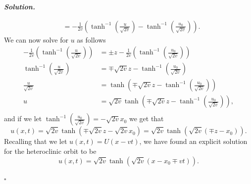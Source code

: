 \documentclass[12pt]{report}
\newenvironment{solution}[1][\it{Solution}]{\textbf{#1. } }{$\square$}
\newcommand{\paren}[1]{{\left(#1\right)}} %
\begin{document}
\begin{solution}
\begin{enumerate}
\begin{align*}
            &= -\frac{1}{2v}\paren{\tanh^{-1}\paren{\frac{u}{\sqrt{2v}}}-\tanh^{-1}\paren{\frac{u_0}{\sqrt{2v}}}}.
        \end{align*}
        We can now solve for $u$ as follows
        \begin{align*}
            -\frac{1}{2v}\paren{\tanh^{-1}\paren{\frac{u}{\sqrt{2v}}}} &= \pm z -  \frac{1}{2v}\paren{\tanh^{-1}\paren{\frac{u_0}{\sqrt{2v}}}}\\
            \tanh^{-1}\paren{\frac{u}{\sqrt{2v}}} &= \mp \sqrt{2v} z -  \tanh^{-1}\paren{\frac{u_0}{\sqrt{2v}}}\\
            \frac{u}{\sqrt{2v}} &= \tanh\paren{\mp \sqrt{2v} z -  \tanh^{-1}\paren{\frac{u_0}{\sqrt{2v}}}}\\
            u &= \sqrt{2v}\tanh\paren{\mp \sqrt{2v} z -  \tanh^{-1}\paren{\frac{u_0}{\sqrt{2v}}}},\\
        \end{align*}
        and if we let $\tanh^{-1}\paren{\frac{u_0}{\sqrt{2v}}} = -\sqrt{2v}x_0$ we get that
        \[
            u(x,t) = \sqrt{2v}\tanh(\mp\sqrt{2v}z - \sqrt{2v}x_0) = \sqrt{2v}\tanh(\sqrt{2v}(\mp z - x_0)). 
        \]
        Recalling that we let $u(x,t) = U(x-vt)$, we have found an explicit solution for the heteroclinic orbit to be
        \[
            u(x,t) = \sqrt{2v}\tanh(\sqrt{2v}(x - x_0 \mp v t)).
        \]
    \end{enumerate}
\end{solution}
\end{document}
